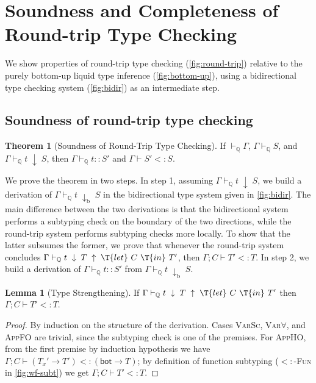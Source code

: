 \documentclass[10pt,preprint]{sigplanconf-pldi16}
\theoremstyle{definition}
\newtheorem{theorem}{Theorem}
\newtheorem{lemma}{Lemma}
\newcommand{\Subt}{<:}
\newcommand{\env}{\Gamma}
\newcommand{\produce}{\;\uparrow\;}
\newcommand{\consume}{\;\downarrow\;}
\newcommand{\consumeB}{\;{\mathrm{\downarrow_b}}\;}
\newcommand{\tbot}{\mathsf{bot}}
\newcommand{\contT}[2]{\T{let}\ {#1}\ \T{in}\ {#2}}
\newcommand{\quals}{\mathbb{Q}}
\newcommand{\entailsQ}{\vdash_{\quals}}
\newif\iflong
\begin{document}



\iflong
\appendix
\section{Soundness and Completeness of Round-trip Type Checking}\label{app:proofs}


We show properties of round-trip type checking (\autoref{fig:round-trip})
relative to the purely bottom-up liquid type inference (\autoref{fig:bottom-up}),
using a bidirectional type checking system (\autoref{fig:bidir}) as an intermediate step.

\subsection{Soundness of round-trip type checking}

\addtocounter{theorem}{-2}

\begin{theorem}[Soundness of Round-Trip Type Checking]\label{thm:soundness}
If $\entailsQ \env$, $\env\entailsQ S$, and $\env \entailsQ t \consume S$, then $\env\entailsQ t :: S'$ and $\env \vdash S' \Subt S$.
\end{theorem}

We prove the theorem in two steps.
In step 1, assuming $\env \entailsQ t \consume S$,
we build a derivation of $\env \entailsQ t \consumeB S$
in the bidirectional type system given in \autoref{fig:bidir}.
The main difference between the two derivations is that 
the bidirectional system performs a subtyping check on the boundary of the two directions,
while the round-trip system performs subtyping checks more locally.
To show that the latter subsumes the former,
we prove that whenever the round-trip system concludes $\env \entailsQ t \consume T \produce \contT{C}{T'}$, 
then $\env;C\vdash T'\Subt T$.
In step 2, we build a derivation of $\env\entailsQ t :: S'$ from $\env \entailsQ t \consumeB S$.

\begin{lemma}[Type Strengthening]\label{lemma:strengthen}
If $\env \entailsQ t \consume T \produce \contT{C}{T'}$ then $\env;C\vdash T'\Subt T$.
\end{lemma}
\begin{proof}
By induction on the structure of the derivation. 
Cases \textsc{VarSc}, \textsc{Var$\forall$}, and \textsc{AppFO} are trivial,
since the subtyping check is one of the premises.
For \textsc{AppHO}, from the first premise by induction hypothesis we have
$\env;C\vdash(T_x'\to T')\Subt (\tbot\to T)$;
by definition of function subtyping (\textsc{$\Subt$-Fun} in \autoref{fig:wf-subt})
we get $\env;C\vdash T'\Subt T$.
\end{proof}
\end{document}
